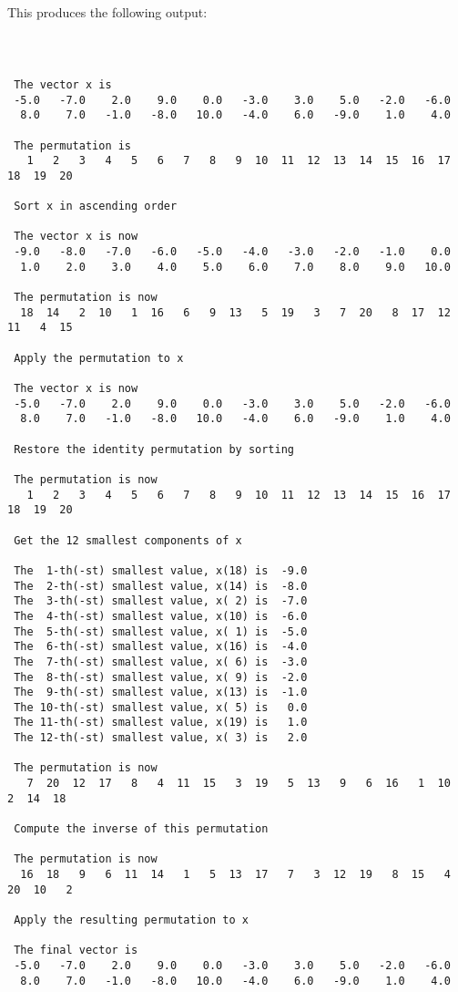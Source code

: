 \documentclass{galahad}
\begin{document}
\noindent
This produces the following output:
{\tt
\begin{verbatim}
 
 The vector x is
 -5.0   -7.0    2.0    9.0    0.0   -3.0    3.0    5.0   -2.0   -6.0
  8.0    7.0   -1.0   -8.0   10.0   -4.0    6.0   -9.0    1.0    4.0

 The permutation is
   1   2   3   4   5   6   7   8   9  10  11  12  13  14  15  16  17  18  19  20

 Sort x in ascending order

 The vector x is now
 -9.0   -8.0   -7.0   -6.0   -5.0   -4.0   -3.0   -2.0   -1.0    0.0
  1.0    2.0    3.0    4.0    5.0    6.0    7.0    8.0    9.0   10.0

 The permutation is now
  18  14   2  10   1  16   6   9  13   5  19   3   7  20   8  17  12  11   4  15

 Apply the permutation to x

 The vector x is now
 -5.0   -7.0    2.0    9.0    0.0   -3.0    3.0    5.0   -2.0   -6.0
  8.0    7.0   -1.0   -8.0   10.0   -4.0    6.0   -9.0    1.0    4.0

 Restore the identity permutation by sorting

 The permutation is now
   1   2   3   4   5   6   7   8   9  10  11  12  13  14  15  16  17  18  19  20

 Get the 12 smallest components of x

 The  1-th(-st) smallest value, x(18) is  -9.0
 The  2-th(-st) smallest value, x(14) is  -8.0
 The  3-th(-st) smallest value, x( 2) is  -7.0
 The  4-th(-st) smallest value, x(10) is  -6.0
 The  5-th(-st) smallest value, x( 1) is  -5.0
 The  6-th(-st) smallest value, x(16) is  -4.0
 The  7-th(-st) smallest value, x( 6) is  -3.0
 The  8-th(-st) smallest value, x( 9) is  -2.0
 The  9-th(-st) smallest value, x(13) is  -1.0
 The 10-th(-st) smallest value, x( 5) is   0.0
 The 11-th(-st) smallest value, x(19) is   1.0
 The 12-th(-st) smallest value, x( 3) is   2.0

 The permutation is now
   7  20  12  17   8   4  11  15   3  19   5  13   9   6  16   1  10   2  14  18

 Compute the inverse of this permutation

 The permutation is now
  16  18   9   6  11  14   1   5  13  17   7   3  12  19   8  15   4  20  10   2

 Apply the resulting permutation to x

 The final vector is
 -5.0   -7.0    2.0    9.0    0.0   -3.0    3.0    5.0   -2.0   -6.0
  8.0    7.0   -1.0   -8.0   10.0   -4.0    6.0   -9.0    1.0    4.0

\end{verbatim}
}
\end{document}
